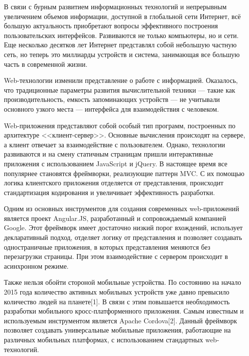 В связи с бурным развитием информационных технологий и непрерывным увеличением объемов информации, доступной в глобальной сети Интернет, всё большую актуальность приобретают вопросы эффективного построения пользовательских интерфейсов. Развиваются не только компьютеры, но и сети. Еще несколько десятков лет Интернет представлял собой небольшую частную сеть, но теперь это миллиарды устройств и система, занимающая все большую часть в современной жизни.

Web-технологии изменили представление о работе с информацией. Оказалось, что традиционные параметры развития вычислительной техники --- такие как производительность, емкость запоминающих устройств --- не учитывали основного узкого места --- интерфейса для взаимодействия с человеком.

Web-приложения представляют собой особый тип программ, построенных по архитектуре <<клиент-сервер>>. Основные вычисления происходят на сервере, а клиент отвечает за взаимодействие с пользователем. Однако, технологии развиваются и на смену статичным страницам пришли интерактивные приложения с использованием JavaScript и jQuery. В настоящее время все популярнее становятся фреймворки, реализующие паттерн MVC. С их помощью логика клиентского приложения отделяется от представления, происходит стандартизация кодирования и увеличивает эффективность разработки.

Одним из основных инструментов для создания современных web-приложений является проект Angular.JS, разработанный и сопровождаемый компанией Google. Этот фреймворк имеет достаточно низкий порог вхождений, использует декларативный подход, отделяет логику от представления и позволяет создавать одностраничные приложения, в которых представления меняются без перезагрузки страницы. При этом взаимодействие с сервером происходит в асинхронном режиме.

Также нельзя обойти стороной мобильные устройства. По состоянию на начало 2015 года количество активных мобильных устройств уже давно превысило количество людей на планете[1]. В связи с этим повышается необходимость разработки мобильного кросс-платформенного приложения. Самым известным и используемым инструментом является Apache Cordova[2]. Данный фреймворк позволяет создавать универсальные мобильные приложения, работающие на различных мобильных платформах, с использованием стандартных web-технологий.

